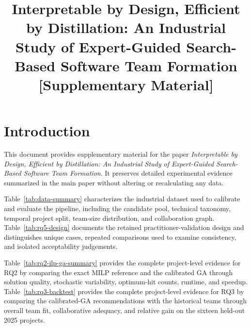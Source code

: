\documentclass[conference]{IEEEtran}
\begin{document}
\title{Interpretable by Design, Efficient by Distillation: An Industrial Study of Expert-Guided Search-Based Software Team Formation [Supplementary Material]\\
}


\author{

}

\maketitle

\renewcommand{\thetable}{S\arabic{table}}

\section{Introduction}

This document provides supplementary material for the paper \emph{Interpretable by Design, Efficient by Distillation: An Industrial Study of Expert-Guided Search-Based Software Team Formation}. It preserves detailed experimental evidence summarized in the main paper without altering or recalculating any data.

Table~\ref{tab:data-summary} characterizes the industrial dataset used to calibrate and evaluate the pipeline, including the candidate pool, technical taxonomy, temporal project split, team-size distribution, and collaboration graph. Table~\ref{tab:rq5-design} documents the retained practitioner-validation design and distinguishes unique cases, repeated comparisons used to examine consistency, and isolated acceptability judgements.

Table~\ref{tab:rq2-ilp-ga-summary} provides the complete project-level evidence for RQ2 by comparing the exact MILP reference and the calibrated GA through solution quality, stochastic variability, optimum-hit counts, runtime, and speedup. Table~\ref{tab:rq3-backtest} provides the complete project-level evidence for RQ3 by comparing the calibrated-GA recommendations with the historical teams through overall team fit, collaborative adequacy, and relative gain on the sixteen held-out 2025 projects.
\end{document}
